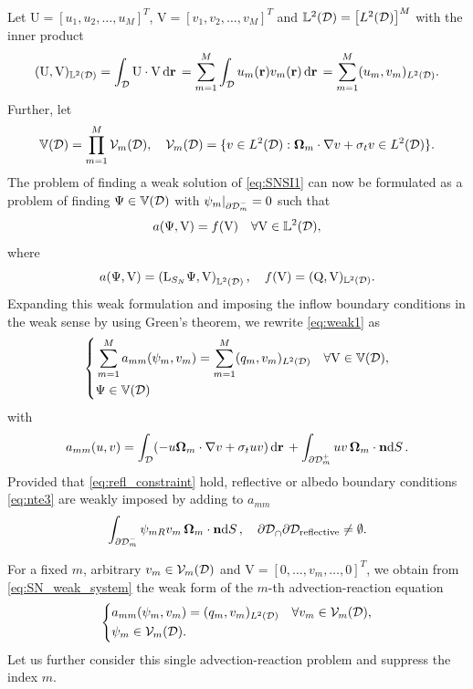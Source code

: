 Let $\mathrm{U} = [u_1,u_2,\ldots,u_M]^T$, $\mathrm{V} = [v_1,v_2,\ldots,v_M]^T$ and $\LL{\VV} =
\bigl[\Lp[2](\VV)\bigr]^M$ with the inner product 
$$
\ip{\LL{\VV}}{\mathrm{U},\mathrm{V}} = \int_{\VV}\mathrm{U}\cdot\mathrm{V}\,\d{\br} = \sum_{m=1}^M \int_{\VV} u_m(\br)
v_m(\br)\,\d{\br} = \sum_{m=1}^M (u_m, v_m)_{\Lp[2](\VV)}.
$$
Further, let
$$
	\mathbb{V}(\VV) = \prod_{m=1}^M \Space_{m}(\VV),\quad \Space_{m}(\VV) = \{v\in\Lp[2](\VV): 
	\bomega_m\cdot\nabla v + \sigma_t v \in\Lp[2](\VV)\}.
$$
The problem of finding a weak solution of \eqref{eq:SNSI1} can now be formulated as a problem
of finding $\Psi \in \mathbb{V}(\VV)$ with $\psi_m\vert_{\pVm[-]{m}} = 0$ such that 
\begin{equation}\label{eq:weak1}
	a(\Psi,\mathrm{V}) = f(\mathrm{V}) \quad \forall \mathrm{V}\in	\LL\VV,
\end{equation}
where
$$
	a(\Psi,\mathrm{V}) = \left(\mathrm{L}_{S_N} \Psi, \mathrm{V}\right)_{\LL\VV},\quad 
	f(\mathrm{V}) = (\mathrm{Q}, \mathrm{V})_{\LL\VV}.
$$%
Expanding this weak formulation and imposing the inflow boundary conditions in the weak sense by using Green's theorem,
we rewrite \eqref{eq:weak1} as
\begin{equation}\label{eq:SN_weak_system}
\left\{
\begin{aligned}
	& \sum_{m=1}^M a_{mm}(\psi_m, v_m) = \sum_{m=1}^M (q_m, v_m)_{\Lp[2](\VV)} \quad \forall
	\mathrm{V}\in\mathbb{V}(\VV),\\
	& \Psi \in \mathbb{V}(\VV)
\end{aligned}
\right.
\end{equation}
with
$$
	a_{mm}(u, v) = \int_{\VV} (-u\bomega_m\cdot\nabla v + 
	\sigma_t u v)\,\d{\br} + \int_{\pVm[+]{m}} u v\, \bomega_m\cdot\bn \d{S}.
$$
Provided that \eqref{eq:refl_constraint} hold, reflective or albedo boundary conditions \eqref{eq:nte3} are weakly
imposed by adding to $a_{mm}$ 
\begin{equation}\label{eq:refl_weak}
	\int_{\pVm[-]{m}} \psi_{mR} v_m\, \bomega_m\cdot\bn \d{S}, \quad \pVm \cap \partial\VV_{\text{reflective}} \neq
	\emptyset. 
\end{equation}

For a fixed $m$, arbitrary $v_m\in \Space_m(\VV)$ and $\mathrm{V} =
[0,\ldots,v_m,\ldots, 0]^T$, we obtain from \eqref{eq:SN_weak_system} the weak form of the
$m$-th advection-reaction equation
\begin{equation}\label{eq:SN_weak_one}
\left\{
\begin{aligned}
	& a_{mm}(\psi_m, v_m) = (q_m, v_m)_{\Lp[2](\VV)} \quad \forall v_m\in \Space_m(\VV),\\
	& \psi_m \in \Space_{m}(\VV).
\end{aligned}
\right.
\end{equation}
Let us further consider this single advection-reaction problem and suppress the index $m$. 


